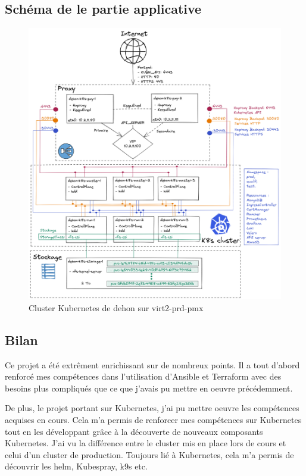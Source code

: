 \documentclass[12pt, a4paper, twoside]{article}
\begin{document}
\subsection{Schéma de le partie applicative}
\begin{figure}[!ht]
    \centering
        \includegraphics[width=\textwidth]{src/graph_dehon2.png}
    \caption{Cluster \gls{Kubernetes} de dehon sur virt2-prd-pmx}
    \label{fig:graph_dehon2}
\end{figure}

\subsection{Bilan}
Ce projet a été extrêment enrichissant sur de nombreux points.
Il a tout d'abord renforcé mes compétences dans l'utilisation d'\gls{Ansible} et \gls{Terraform} avec des besoins plus compliqués que ce que j'avais pu mettre en oeuvre précédemment.

De plus, le projet portant sur \gls{Kubernetes}, j'ai pu mettre oeuvre les compétences acquises en cours. 
Cela m'a permis de renforcer mes compétences sur \gls{Kubernetes} tout en les développant grâce à la découverte de nouveaux composants \gls{Kubernetes}.
J'ai vu la différence entre le \gls{cluster} mis en place lors de cours et celui d'un \gls{cluster} de production.
Toujours lié à \gls{Kubernetes}, cela m'a permis de découvrir les helm, \gls{Kubespray}, k9s etc.
\end{document}
